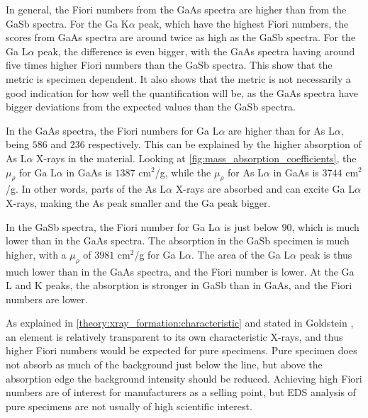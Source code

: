 In general, the Fiori numbers from the GaAs spectra are higher than from the GaSb spectra.
For the Ga K$\alpha$ peak, which have the highest Fiori numbers, the scores from GaAs spectra are around twice as high as the GaSb spectra.
For the Ga L$\alpha$ peak, the difference is even bigger, with the GaAs spectra having around five times higher Fiori numbers than the GaSb spectra.
This show that the metric is specimen dependent.
It also shows that the metric is not necessarily a good indication for how well the quantification will be, as the GaAs spectra have bigger deviations from the expected values than the GaSb spectra.



In the GaAs spectra, the Fiori numbers for Ga L$\alpha$ are higher than for As L$\alpha$, being $586$ and $236$ respectively.
This can be explained by the higher absorption of As L$\alpha$ X-rays in the material.
Looking at \cref{fig:mass_absorption_coefficients}, the $\mu_\rho$ for Ga L$\alpha$ in GaAs is $1387$ cm$^2$/g, while the $\mu_\rho$ for As L$\alpha$ in GaAs is $3744$ cm$^2$/g.
In other words, parts of the As L$\alpha$ X-rays are absorbed and can excite Ga L$\alpha$ X-rays, making the As peak smaller and the Ga peak bigger.


In the GaSb spectra, the Fiori number for Ga L$\alpha$ is just below $90$, which is much lower than in the GaAs spectra.
The absorption in the GaSb specimen is much higher, with a $\mu_\rho$ of $3981$ cm$^2$/g for Ga L$\alpha$.
The area of the Ga L$\alpha$ peak is thus much lower than in the GaAs spectra, and the Fiori number is lower.
At the Ga L and K peaks, the absorption is stronger in GaSb than in GaAs, and the Fiori numbers are lower.


As explained in \cref{theory:xray_formation:characteristic} and stated in Goldstein \cite[Ch. 4.4]{goldstein_scanning_2018}, an element is relatively transparent to its own characteristic X-rays, and thus higher Fiori numbers would be expected for pure specimens.
Pure specimen does not absorb as much of the background just below the line, but above the absorption edge the background intensity should be reduced.
Achieving high Fiori numbers are of interest for manufacturers as a selling point, but EDS analysis of pure specimens are not usually of high scientific interest.


